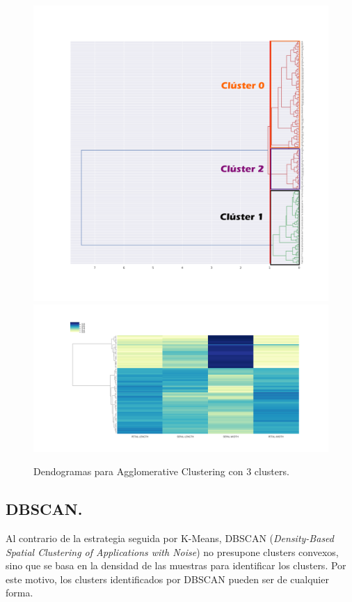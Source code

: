 \documentclass[a4paper, 20pt]{article}
\begin{document}
\begin{figure}[h]
\centering
\includegraphics[scale=0.35]{dani/dendrogramcolor.png}
\includegraphics[scale=0.35]{dani/dendscatAggClusterIRIS.png}
\caption{Dendogramas para Agglomerative Clustering con 3 clusters.}
\label{dac}
\end{figure}

\clearpage

\subsection{DBSCAN.}

Al contrario de la estrategia seguida por K-Means, DBSCAN (\textit{Density-Based Spatial Clustering of Applications with Noise}) no presupone clusters convexos, sino que se basa en la densidad de las muestras para identificar los clusters. Por este motivo, los clusters identificados por DBSCAN pueden ser de cualquier forma.\\
\end{document}
